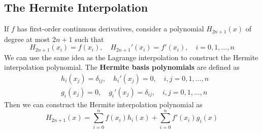 \documentclass{matharticle}
\begin{document}
\subsection{The Hermite Interpolation}
If $f$ has first-order continuous derivatives, consider a polynomial $H_{2n+1}(x)$ of degree at most $2n+1$ such that
\begin{equation}
	H_{2n+1}(x_i) = f(x_i), \quad H_{2n+1}'(x_i) = f'(x_i), \quad i = 0, 1, \ldots, n
\end{equation}
We can use the same idea as the Lagrange interpolation to construct the Hermite interpolation polynomial. The \textbf{Hermite basis polynomials} are defined as
\begin{equation}
	\begin{aligned}
		 & h_i(x_j) = \delta_{ij}, \quad h_i'(x_j) = 0, \quad i, j = 0, 1, \ldots, n \\
		 & g_i(x_j) = 0, \quad g_i'(x_j) = \delta_{ij}, \quad i, j = 0, 1, \ldots, n
	\end{aligned}
\end{equation}
Then we can construct the Hermite interpolation polynomial as
\begin{equation}
	H_{2n+1}(x) = \sum_{i=0}^{n} f(x_i) h_i(x) + \sum_{i=0}^{n} f'(x_i) g_i(x)
\end{equation}
\end{document}
